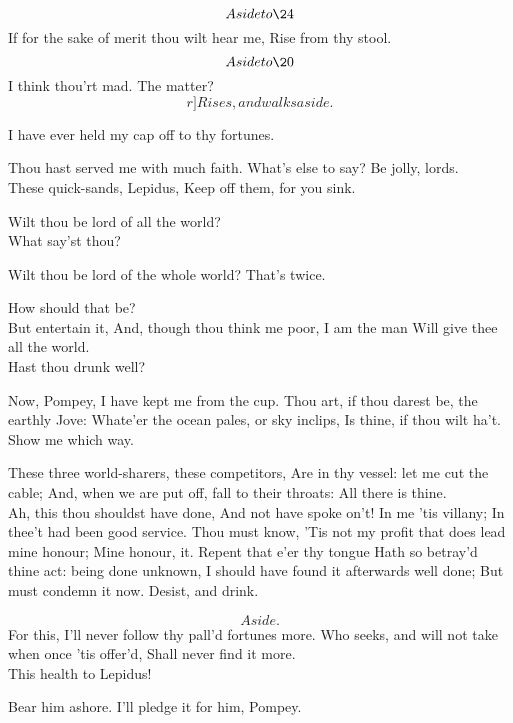 \documentclass{book}
\begin{document}
	\[Aside to \24\]  If for the sake of merit thou wilt hear me,
	Rise from thy stool. \\

	\[Aside to \20\]  I think thou'rt mad. The matter?
	\[r]Rises, and walks aside.\]

	I have ever held my cap off to thy fortunes.

	Thou hast served me with much faith. What's else to say?
	Be jolly, lords. \\

\1	                  These quick-sands, Lepidus,
	Keep off them, for you sink.

	Wilt thou be lord of all the world? \\

	What say'st thou?

	Wilt thou be lord of the whole world? That's twice.

	How should that be? \\

	But entertain it,
	And, though thou think me poor, I am the man
	Will give thee all the world. \\

	Hast thou drunk well?

	Now, Pompey, I have kept me from the cup.
	Thou art, if thou darest be, the earthly Jove:
	Whate'er the ocean pales, or sky inclips,
	Is thine, if thou wilt ha't. \\

	Show me which way.

	These three world-sharers, these competitors,
	Are in thy vessel: let me cut the cable;
	And, when we are put off, fall to their throats:
	All there is thine. \\

	Ah, this thou shouldst have done,
	And not have spoke on't! In me 'tis villany;
	In thee't had been good service. Thou must know,
	'Tis not my profit that does lead mine honour;
	Mine honour, it. Repent that e'er thy tongue
	Hath so betray'd thine act: being done unknown,
	I should have found it afterwards well done;
	But must condemn it now. Desist, and drink.

	\[Aside.\]  For this,
	I'll never follow thy pall'd fortunes more.
	Who seeks, and will not take when once 'tis offer'd,
	Shall never find it more. \\

	This health to Lepidus!

\1	Bear him ashore. I'll pledge it for him, Pompey.
\end{document}
